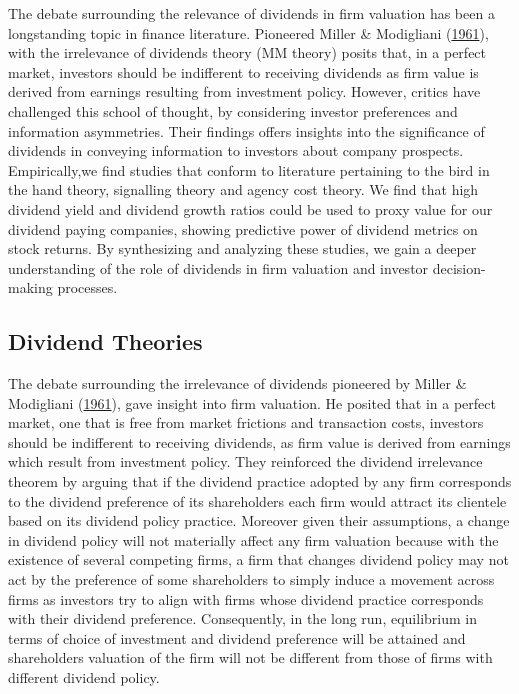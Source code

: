 \documentclass[11pt,preprint, authoryear]{elsarticle}
\numberwithin{equation}{section}
\numberwithin{figure}{section}
\numberwithin{table}{section}
\begin{document}
The debate surrounding the relevance of dividends in firm valuation has
been a longstanding topic in finance literature. Pioneered Miller \&
Modigliani (\protect\hyperlink{ref-miller}{1961}), with the irrelevance
of dividends theory (MM theory) posits that, in a perfect market,
investors should be indifferent to receiving dividends as firm value is
derived from earnings resulting from investment policy. However, critics
have challenged this school of thought, by considering investor
preferences and information asymmetries. Their findings offers insights
into the significance of dividends in conveying information to investors
about company prospects. Empirically,we find studies that conform to
literature pertaining to the bird in the hand theory, signalling theory
and agency cost theory. We find that high dividend yield and dividend
growth ratios could be used to proxy value for our dividend paying
companies, showing predictive power of dividend metrics on stock
returns. By synthesizing and analyzing these studies, we gain a deeper
understanding of the role of dividends in firm valuation and investor
decision-making processes.

\hypertarget{dividend-theories}{%
\subsection{\texorpdfstring{Dividend Theories
\label{theory}}{Dividend Theories }}\label{dividend-theories}}

The debate surrounding the irrelevance of dividends pioneered by Miller
\& Modigliani (\protect\hyperlink{ref-miller}{1961}), gave insight into
firm valuation. He posited that in a perfect market, one that is free
from market frictions and transaction costs, investors should be
indifferent to receiving dividends, as firm value is derived from
earnings which result from investment policy. They reinforced the
dividend irrelevance theorem by arguing that if the dividend practice
adopted by any firm corresponds to the dividend preference of its
shareholders each firm would attract its clientele based on its dividend
policy practice. Moreover given their assumptions, a change in dividend
policy will not materially affect any firm valuation because with the
existence of several competing firms, a firm that changes dividend
policy may not act by the preference of some shareholders to simply
induce a movement across firms as investors try to align with firms
whose dividend practice corresponds with their dividend preference.
Consequently, in the long run, equilibrium in terms of choice of
investment and dividend preference will be attained and shareholders
valuation of the firm will not be different from those of firms with
different dividend policy.
\end{document}
